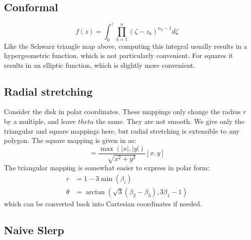 \documentclass{amsart}[12pt]
\begin{document}
\subsection{Conformal}
\begin{equation}
f(z) = \int_0^z \prod_{k=1}^n (\zeta - z_k)^{\alpha_k-1} d\zeta
\end{equation}
 Like the Schwarz triangle map above,
computing this integral usually results in a hypergeometric function,
which is not particularly convenient. For squares it results in an elliptic
function, which is slightly more convenient.\cite{fong16}

\subsection{Radial stretching}
Consider the disk in polar coordinates. These mappings only change the radius
$r$ by a multiple, and leave $theta$ the same. They are not smooth. We give
only the triangular and square mappings here, but radial stretching is
extensible to any polygon. The square mapping is given in \cite{fong15} as:
\begin{equation}
  [u, v] = \frac{\max(|x|,|y|)}{\sqrt{x^2+y^2}} [x,y]
\end{equation}
The triangular mapping is somewhat easier to express in polar form:
\begin{equation}\begin{split}
  r &= 1-3 \min( \beta_i ) \\
  \theta &= \arctan\left(\sqrt{3}(\beta_2-\beta_3),
  3\beta_1 - 1 \right)
\end{split}\end{equation}
which can be converted back into Cartesian coordinates if needed.

\subsection{Naive Slerp}
\end{document}
